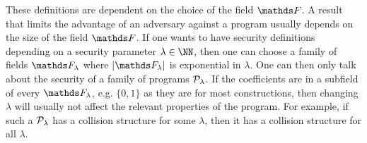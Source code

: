 These definitions are dependent on the choice of the field $\F$.
A result that limits the advantage of an adversary against a program usually depends on the size of the field $\F$.
If one wants to have security definitions depending on a security parameter $\lambda \in \NN$,
then one can choose a family of fields $\F_\lambda$ where $|\F_\lambda|$ is exponential in $\lambda$.
One can then only talk about the security of a family of programs $\P_\lambda$.
If the coefficients are in a subfield of every $\F_\lambda$,
e.g. $\{0,1\}$ as they are for most constructions,
then changing $\lambda$ will usually not affect the relevant properties of the program.
For example, if such a $\P_\lambda$ has a collision structure for some $\lambda$,
then it has a collision structure for all $\lambda$.

